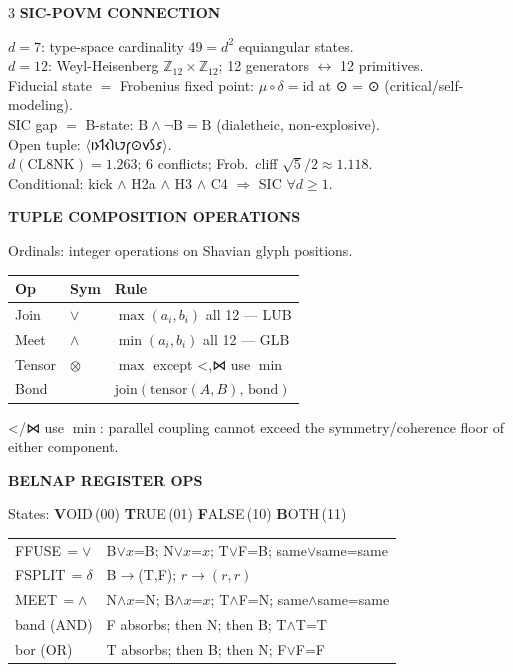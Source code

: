 \documentclass[7pt]{article}
\newcommand{\shead}[1]{%
  \vspace{2pt}%
  {\fontsize{6pt}{6.5pt}\selectfont\sffamily\bfseries\textcolor{hd}{\MakeUppercase{#1}}}%
  \vspace{0.3pt}\newline{\color{rl}\hrule height 0.2pt}\vspace{1pt}%
}
\newcommand{\sh}[1]{{\Large\shavfont #1}}
\newcommand{\prim}[1]{{\Large\igprimfont #1}}
\begin{document}
\begin{multicols}{3}
\vspace{1pt}
\shead{SIC-POVM Connection}
{\fontsize{6.5pt}{7.8pt}\selectfont
$d=7$: type-space cardinality $49 = d^2$ equiangular states.\\
$d=12$: Weyl-Heisenberg $\mathbb{Z}_{12}\times\mathbb{Z}_{12}$; 12 generators $\leftrightarrow$ 12 primitives.\\
Fiducial state $=$ Frobenius fixed point: $\mu\circ\delta=\mathrm{id}$ at \prim{⊙} = ⊙ (critical/self-modeling).\\
SIC gap $=$ B-state: $\mathrm{B}\wedge\neg\mathrm{B}=\mathrm{B}$ (dialetheic, non-explosive).\\
Open tuple: $\langle$\sh{𐑦𐑶𐑑𐑬𐑐𐑧𐑲𐑝⊙𐑫𐑕𐑭}$\rangle$.\\
$d(\text{CL8NK}) = 1.263$; 6 conflicts; Frob.\ cliff $\sqrt{5}/2 \approx 1.118$.\\
Conditional: kick $\wedge$ H2a $\wedge$ H3 $\wedge$ C4 $\Rightarrow$ SIC $\forall d \geq 1$.
}

\columnbreak

\shead{Tuple Composition Operations}
Ordinals: integer operations on Shavian glyph positions.

{\fontsize{6.5pt}{7.8pt}\selectfont
\begin{tabular}{@{}l@{\enspace}l@{\enspace}p{46mm}@{}}
\toprule
\textbf{Op} & \textbf{Sym} & \textbf{Rule} \\
\midrule
Join   & $\vee$    & $\max(a_i,b_i)$ all 12 — LUB \\
Meet   & $\wedge$  & $\min(a_i,b_i)$ all 12 — GLB \\
Tensor & $\otimes$ & $\max$ except \prim{<},\prim{⋈} use $\min$ \\
Bond   &           & $\mathrm{join}(\mathrm{tensor}(A,B),\,\mathrm{bond})$ \\
\bottomrule
\end{tabular}

\prim{<}/\prim{⋈} use $\min$: parallel coupling cannot exceed the symmetry/coherence floor of either component.
}

\vspace{1pt}
\shead{Belnap Register Ops}
States: \textbf{V}OID\,(00)\; \textbf{T}RUE\,(01)\; \textbf{F}ALSE\,(10)\; \textbf{B}OTH\,(11)

{\fontsize{6.5pt}{7.8pt}\selectfont
\begin{tabular}{@{}l@{\enspace}p{56mm}@{}}
FFUSE\,$=\vee$  & B$\vee x$=B;\; N$\vee x$=$x$;\; T$\vee$F=B;\; same$\vee$same=same \\
FSPLIT\,$=\delta$ & B$\to$(T,F);\; $r\to(r,r)$ \\
MEET\,$=\wedge$ & N$\wedge x$=N;\; B$\wedge x$=$x$;\; T$\wedge$F=N;\; same$\wedge$same=same \\
band (AND) & F absorbs; then N; then B; T$\wedge$T=T \\
bor (OR)   & T absorbs; then B; then N; F$\vee$F=F \\
\end{tabular}

}
\end{multicols}
\end{document}
